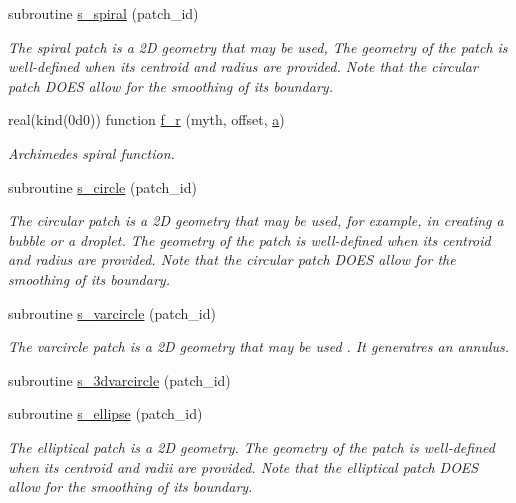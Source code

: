 \begin{DoxyCompactItemize}
subroutine \hyperlink{namespacem__initial__condition_ac4540baa01372eb3df51b268769fa6fc}{s\+\_\+spiral} (patch\+\_\+id)
\begin{DoxyCompactList}\small\item\em The spiral patch is a 2D geometry that may be used, The geometry of the patch is well-\/defined when its centroid and radius are provided. Note that the circular patch D\+O\+ES allow for the smoothing of its boundary. \end{DoxyCompactList}\item 
real(kind(0d0)) function \hyperlink{namespacem__initial__condition_a6bd15d72ae72d7c598bbc3b57cf0b90e}{f\+\_\+r} (myth, offset, \hyperlink{namespacem__initial__condition_a8a559b4d7a1e1e69f5e3b9ea0474e3fa}{a})
\begin{DoxyCompactList}\small\item\em Archimedes spiral function. \end{DoxyCompactList}\item 
subroutine \hyperlink{namespacem__initial__condition_a75d13cb7c7c4f88e8b532cf7e7dda498}{s\+\_\+circle} (patch\+\_\+id)
\begin{DoxyCompactList}\small\item\em The circular patch is a 2D geometry that may be used, for example, in creating a bubble or a droplet. The geometry of the patch is well-\/defined when its centroid and radius are provided. Note that the circular patch D\+O\+ES allow for the smoothing of its boundary. \end{DoxyCompactList}\item 
subroutine \hyperlink{namespacem__initial__condition_a3e1c1480513e75b444ce7a77ed0fe598}{s\+\_\+varcircle} (patch\+\_\+id)
\begin{DoxyCompactList}\small\item\em The varcircle patch is a 2D geometry that may be used . It generatres an annulus. \end{DoxyCompactList}\item 
subroutine \hyperlink{namespacem__initial__condition_aea2bf07e8890b1a108f2f891609174c9}{s\+\_\+3dvarcircle} (patch\+\_\+id)
\item 
subroutine \hyperlink{namespacem__initial__condition_a5e999ad19f23f5f2b059b80e49c0a086}{s\+\_\+ellipse} (patch\+\_\+id)
\begin{DoxyCompactList}\small\item\em The elliptical patch is a 2D geometry. The geometry of the patch is well-\/defined when its centroid and radii are provided. Note that the elliptical patch D\+O\+ES allow for the smoothing of its boundary. \end{DoxyCompactList}\item 

\end{DoxyCompactItemize}
